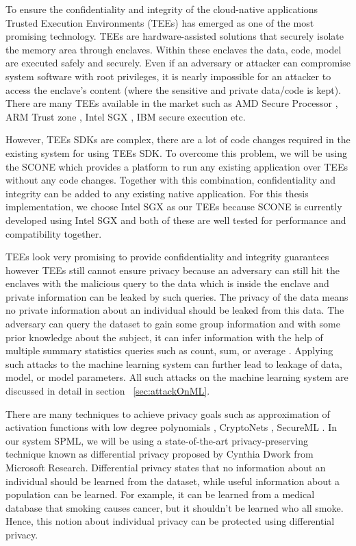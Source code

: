 To ensure the confidentiality and integrity of the cloud-native applications Trusted Execution Environments (TEEs) \cite{59} has emerged as one of the most promising technology. TEEs are hardware-assisted solutions that securely isolate the memory area through enclaves. Within these enclaves the data, code, model are executed safely and securely. Even if an adversary or attacker can compromise system software with root privileges, it is nearly impossible for an attacker to access the enclave's content (where the sensitive and private data/code is kept). There are many TEEs available in the market such as AMD Secure Processor \cite{19}, ARM Trust zone \cite{20}, Intel SGX \cite{9}, IBM secure execution \cite{21} etc. 

However, TEEs SDKs are complex, there are a lot of code changes required in the existing system for using TEEs SDK. To overcome this problem, we will be using the SCONE \cite{22} which provides a platform to run any existing application over TEEs without any code changes. Together with this combination, confidentiality and integrity can be added to any existing native application. For this thesis implementation, we choose Intel SGX as our TEEs because SCONE is currently developed using Intel SGX and both of these are well tested for performance and compatibility together.

TEEs look very promising to provide confidentiality and integrity guarantees however TEEs still cannot ensure privacy because an adversary can still hit the enclaves with the malicious query to the data which is inside the enclave and private information can be leaked by such queries. The privacy of the data means no private information about an individual should be leaked from this data. The adversary can query the dataset to gain some group information and with some prior knowledge about the subject, it can infer information with the help of multiple summary statistics queries such as count, sum, or average \cite{72}. Applying such attacks to the machine learning system can further lead to leakage of data, model, or model parameters. All such attacks on the machine learning system are discussed in detail in section ~\ref{sec:attackOnML}.


There are many techniques to achieve privacy goals such as approximation of activation functions with low degree polynomials \cite{60}, CryptoNets \cite{61},  SecureML \cite{62}. In our system SPML, we will be using a state-of-the-art privacy-preserving technique known as differential privacy proposed by Cynthia Dwork from Microsoft Research\cite{3}. Differential privacy \cite{3} states that no information about an individual should be learned from the dataset, while useful information about a population can be learned. For example, it can be learned from a medical database that smoking causes cancer, but it shouldn't be learned who all smoke. Hence, this notion about individual privacy can be protected using differential privacy. 

